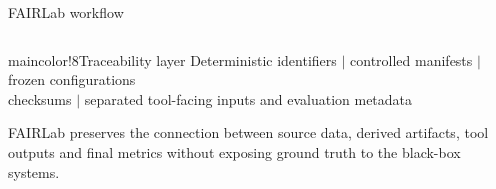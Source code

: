 \documentclass{beamer}
\begin{document}
\begin{frame}{FAIRLab workflow}
\begin{columns}[c,onlytextwidth]
\end{columns}

\vspace{0.55cm}

\begin{colorblock}[black]{maincolor!8}{Traceability layer}
\centering
\small
Deterministic identifiers \quad $\vert$ \quad controlled manifests \quad $\vert$ \quad frozen configurations\\[0.12cm]
checksums \quad $\vert$ \quad separated tool-facing inputs and evaluation metadata
\end{colorblock}

\vspace{0.18cm}

\centering
\scriptsize
FAIRLab preserves the connection between source data, derived artifacts, tool outputs and final metrics without exposing ground truth to the black-box systems.
\end{frame}
\end{document}
